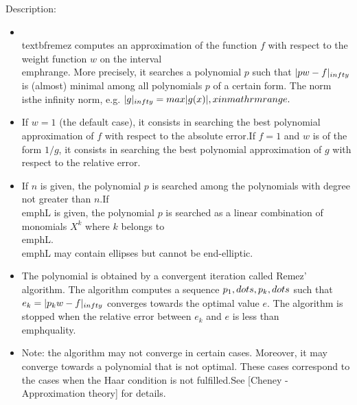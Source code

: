 \noindent Description: \begin{itemize}

\item \\textbf{remez} computes an approximation of the function $f$ with respect to \n   the weight function $w$ on the interval \\emph{range}. More precisely, it \n   searches a polynomial $p$ such that $\\|pw-f\\|_{\\infty}$ is \n   (almost) minimal among all polynomials $p$ of a certain form. The norm is\n   the infinity norm, e.g. $\\|g\\|_{\\infty} = \\max \\{|g(x)|, x \\in \\mathrm{range}\\}.$\n
\item If $w=1$ (the default case), it consists in searching the best \n   polynomial approximation of $f$ with respect to the absolute error.\n   If $f=1$ and $w$ is of the form $1/g$, it consists in \n   searching the best polynomial approximation of $g$ with respect to the \n   relative error.\n
\item If $n$ is given, the polynomial $p$ is searched among the \n   polynomials with degree not greater than $n$.\n   If \\emph{L} is given, the polynomial $p$ is searched as a linear combination \n   of monomials $X^k$ where $k$ belongs to \\emph{L}.\n   \\emph{L} may contain ellipses but cannot be end-elliptic.\n
\item The polynomial is obtained by a convergent iteration called Remez' algorithm. \n   The algorithm computes a sequence $p_1,\\dots ,p_k,\\dots$ \n   such that $e_k = \\|p_k w-f\\|_{\\infty}$ converges towards \n   the optimal value $e$. The algorithm is stopped when the relative error \n   between $e_k$ and $e$ is less than \\emph{quality}.\n
\item Note: the algorithm may not converge in certain cases. Moreover, it may \n   converge towards a polynomial that is not optimal. These cases correspond to \n   the cases when the Haar condition is not fulfilled.\n   See [Cheney - Approximation theory] for details.\n\end{itemize}
